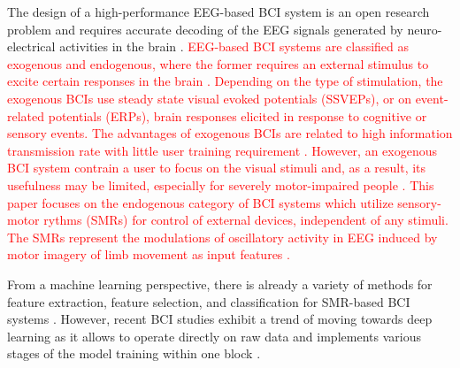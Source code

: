 \documentclass{ieeeaccess}
\begin{document}
The design of a high-performance EEG-based BCI system is an open research problem and requires accurate decoding of the EEG signals generated by neuro-electrical activities in the brain \cite{gerven2009, lotte2007review,lotte2018review}. 
\textcolor{red}{EEG-based BCI systems are classified as exogenous and endogenous, where the former requires an external stimulus to excite certain responses in the brain \cite{wolpaw2012brain, nicolas2012brain}. Depending on the type of stimulation, the exogenous BCIs use steady state visual evoked potentials (SSVEPs), or on event-related potentials (ERPs), brain responses elicited in response to cognitive or sensory events. The advantages of exogenous BCIs are related to high information transmission rate with little user training requirement \cite{nicolas2012brain}. However, an exogenous BCI system contrain a user to focus on the visual stimuli and, as a result, its usefulness may be limited, especially for severely motor-impaired people \cite{chaudhary2016brain}.} 
\textcolor{red}{This paper focuses on the endogenous category of BCI systems which utilize sensory-motor rythms (SMRs) for control of external devices, independent of any stimuli. The SMRs represent the modulations of oscillatory activity in EEG induced by motor imagery of limb movement as input features \cite{pfurtscheller2000spatiotemporal, pfurtscheller2006future}.}  

From a machine learning perspective, there is already a variety of methods for feature extraction, feature selection, and classification for SMR-based BCI systems \cite{bashashati2007survey, lotte2018review}. However, recent BCI studies exhibit a trend of moving towards deep learning as it allows to operate directly on raw data and implements various stages of the model training within one block \cite{roy2019deep}.  
\end{document}
